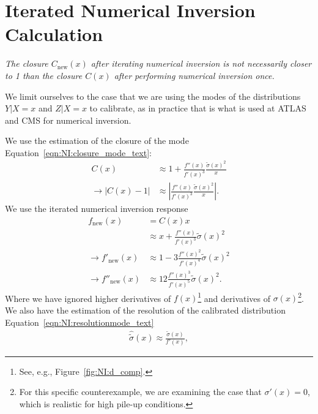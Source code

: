 \section{Iterated Numerical Inversion Calculation}
\label{sec:NI:iterated}
{\it The closure $C_\text{new}(x)$ after iterating numerical inversion is not necessarily closer to 1 than the closure $C(x)$ after performing numerical inversion once.}

\vspace{5mm}

We limit ourselves to the case that we are using the modes of the distributions $Y|X=x$ and $Z|X=x$ to calibrate, as in practice that is what is used at ATLAS and CMS for numerical inversion.

We use the estimation of the closure of the mode Equation~\ref{eqn:NI:closure_mode_text}:
\begin{align}
C(x) &\approx 1+\frac{f''(x)}{f'(x)^3}\frac{\tilde{\sigma}(x)^2}{x}\nonumber\\
\rightarrow |C(x)-1|&\approx \left|\frac{f''(x)}{f'(x)^3}\frac{\tilde{\sigma}(x)^2}{x}\right|.
\end{align}
We use the iterated numerical inversion response
\begin{align}
f_{\text{new}}(x) &= C(x)x\nonumber\\
&\approx x+\frac{f''(x)}{f'(x)^3}\tilde{\sigma}(x)^2\\
\rightarrow f'_{\text{new}}(x) &\approx 1-3\frac{f''(x)^2}{f'(x)^4}\tilde{\sigma}(x)^2\\
\rightarrow f''_{\text{new}}(x) &\approx 12\frac{f''(x)^3}{f'(x)^5}\tilde{\sigma}(x)^2.
\end{align}
Where we have ignored higher derivatives of $f(x)$\footnote{See, e.g., Figure~\ref{fig:NI:d_comp}.} and derivatives of $\sigma(x)$\footnote{For this specific counterexample, we are examining the case that $\sigma'(x)=0$, which is realistic for high pile-up conditions.}.  We also have the estimation of the resolution of the calibrated distribution Equation~\ref{eqn:NI:resolutionmode_text}
\begin{align}
\hat{\tilde{\sigma}}(x) \approx \frac{\tilde{\sigma}(x)}{f'(x)},
\end{align}


